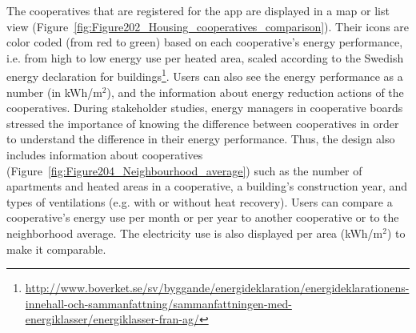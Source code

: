 The cooperatives that are registered for the app are displayed in a map or list view (Figure~\ref{fig:Figure202_Housing_cooperatives_comparison}). Their icons are color coded (from red to green) based on each cooperative's energy performance, i.e. from high to low energy use per heated area, scaled according to the Swedish energy declaration for buildings\footnote{\url{http://www.boverket.se/sv/byggande/energideklaration/energideklarationens-innehall-och-sammanfattning/sammanfattningen-med-energiklasser/energiklasser-fran-ag/}}. 
% 
Users can also see the energy performance as a number (in kWh/m$^2$), and the information about energy reduction actions of the cooperatives. %
% 
During stakeholder studies, energy managers in cooperative boards stressed the importance of knowing the difference between cooperatives in order to understand the difference in their energy performance. Thus, the design also includes information about cooperatives (Figure~\ref{fig:Figure204_Neighbourhood_average}) such as the number of apartments and heated areas in a cooperative, a building's construction year, and types of ventilations (e.g. with or without heat recovery).
% 
Users can compare a cooperative's energy use per month or per year to another cooperative or to the neighborhood average. The electricity use is also displayed per area (kWh/m$^2$) to make it comparable.\\
